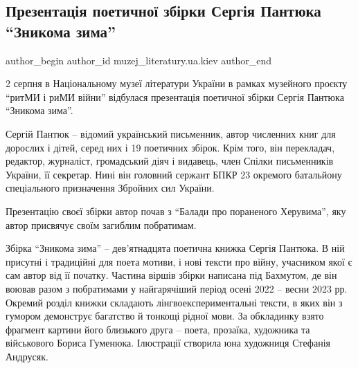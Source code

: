 
 
 
 
 

\subsection{Презентація поетичної збірки Сергія Пантюка \enquote{Зникома зима}}
\label{sec:03_08_2023.fb.muzej_literatury.ua.kiev.1.poetychna_zbirka_sergija_pantjuka_znykoma_zyma}

\ifcmt
 author_begin
   author_id muzej_literatury.ua.kiev
 author_end
\fi

2 серпня в Національному музеї літератури України в рамках музейного проєкту
\enquote{ритМИ і риМИ війни} відбулася презентація поетичної збірки Сергія Пантюка
\enquote{Зникома зима}.

Сергій Пантюк – відомий український письменник, автор численних книг для
дорослих і дітей, серед них і 19 поетичних збірок. Крім того, він перекладач,
редактор, журналіст, громадський діяч і видавець, член Спілки письменників
України, її секретар. Нині він головний сержант БПКР 23 окремого батальйону
спеціального призначення Збройних сил України. 

Презентацію своєї збірки автор почав з \enquote{Балади про пораненого Херувима}, яку
автор присвячує своїм загиблим побратимам. 

Збірка \enquote{Зникома зима} – дев'ятнадцята поетична книжка Сергія Пантюка. В ній
присутні і традиційні для поета мотиви, і нові тексти про війну, учасником якої
є сам автор від її початку. Частина віршів збірки написана під Бахмутом, де він
воював разом з побратимами у найгарячіший період осені 2022 – весни 2023 рр.
Окремий розділ книжки складають лінгвоекспериментальні тексти, в яких він з
гумором демонструє багатство й тонкощі рідної мови. За обкладинку взято
фрагмент картини його близького друга – поета, прозаїка, художника та
військового Бориса Гуменюка. Ілюстрації створила юна художниця Стефанія
Андрусяк.

